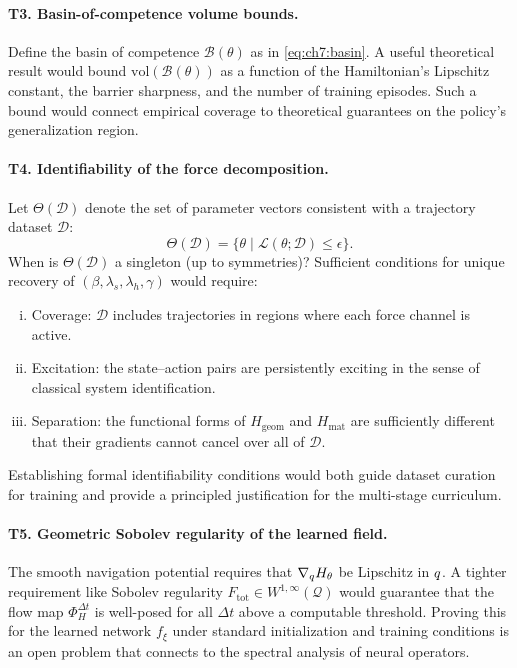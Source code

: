 \paragraph{T3. Basin-of-competence volume bounds.}
Define the basin of competence $\mathcal{B}(\theta)$ as in
\eqref{eq:ch7:basin}.
A useful theoretical result would bound
$\mathrm{vol}(\mathcal{B}(\theta))$ as a function of the
Hamiltonian's Lipschitz constant, the barrier sharpness, and the
number of training episodes.
Such a bound would connect empirical coverage to theoretical
guarantees on the policy's generalization region.

\paragraph{T4. Identifiability of the force decomposition.}
Let $\Theta(\mathcal{D})$ denote the set of parameter vectors
consistent with a trajectory dataset $\mathcal{D}$:
\begin{equation}
  \Theta(\mathcal{D})
  = \bigl\{\theta
    \;\big|\;
    \mathcal{L}(\theta;\mathcal{D}) \leq \epsilon
  \bigr\}.
  \label{eq:ch7:theta_compat}
\end{equation}
When is $\Theta(\mathcal{D})$ a singleton (up to symmetries)?
Sufficient conditions for unique recovery of
$(\beta, \lambda_s, \lambda_h, \gamma)$ would require:
\begin{enumerate}[(i)]
  \item Coverage: $\mathcal{D}$ includes trajectories in regions
        where each force channel is active.
  \item Excitation: the state–action pairs are persistently exciting
        in the sense of classical system identification.
  \item Separation: the functional forms of
        $H_{\mathrm{geom}}$ and $H_{\mathrm{mat}}$ are
        sufficiently different that their gradients cannot
        cancel over all of $\mathcal{D}$.
\end{enumerate}
Establishing formal identifiability conditions would both guide
dataset curation for training and provide a principled justification
for the multi-stage curriculum.

\paragraph{T5. Geometric Sobolev regularity of the learned field.}
The smooth navigation potential requires that
$\nabla_q H_\theta$ be Lipschitz in $q$.
A tighter requirement like Sobolev regularity
$F_{\mathrm{tot}} \in W^{1,\infty}(\mathcal{Q})$ would guarantee
that the flow map $\Phi^{\Delta t}_H$ is well-posed for all $\Delta t$
above a computable threshold.
Proving this for the learned network $f_\xi$ under standard
initialization and training conditions is an open problem that
connects to the spectral analysis of neural operators.


